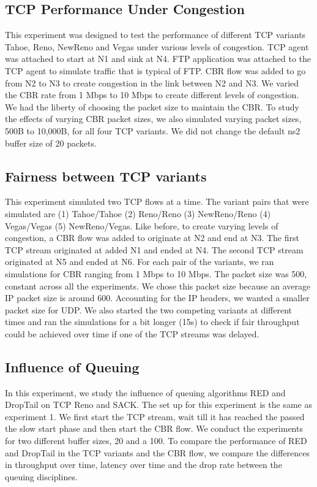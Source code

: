  \subsection{TCP Performance Under Congestion}
This experiment was designed to test the performance of different TCP variants Tahoe, Reno, NewReno and Vegas under various levels of congestion. TCP agent was attached to start at N1 and sink at N4. FTP application was attached to the TCP agent to simulate traffic that is typical of FTP. CBR flow was added to go from N2 to N3 to create congestion in the link between N2 and N3. We varied the CBR rate from 1 Mbps to 10 Mbps to create different levels of congestion. We had the liberty of choosing the packet size to maintain the CBR. To study the effects of varying CBR packet sizes, we also simulated varying packet sizes, 500B to 10,000B, for all four TCP variants. We did not change the default ns2 buffer size of 20 packets.  
 \subsection{Fairness between TCP variants}
This experiment simulated two TCP flows at a time. The variant pairs that were simulated are (1) Tahoe/Tahoe (2) Reno/Reno (3) NewReno/Reno (4) Vegas/Vegas (5) NewReno/Vegas. Like before, to create varying levels of congestion, a CBR flow was added to originate at N2 and end at N3. The first TCP stream originated at added N1 and ended at N4. The second TCP stream originated at N5 and ended at N6. For each pair of the variants, we ran simulations for CBR ranging from 1 Mbps to 10 Mbps. The packet size was 500, constant across all the experiments. We chose this packet size because an average IP packet size is around 600. Accounting for the IP headers, we wanted a smaller packet size for UDP. 
We also started the two competing variants at different times and ran the simulations for a bit longer (15s) to check if fair throughput could be achieved over time if one of the TCP streams was delayed.
 \subsection{Influence of Queuing}
In this experiment, we study the influence of queuing algorithms RED and DropTail on TCP Reno and SACK. The set up for this experiment is the same as experiment 1. We first start the TCP stream, wait till it has reached the passed the slow start phase and then start the CBR flow. We conduct the experiments for two different buffer sizes, 20 and a 100. To compare the performance of RED and DropTail in the TCP variants and the CBR flow, we compare the differences in throughput over time, latency over time and the drop rate between the queuing disciplines. 